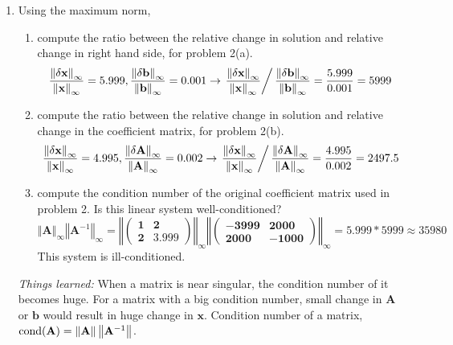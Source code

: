 \documentclass[10pt]{report}
\newcommand{\norm}[2][\infty] {\left\Vert \mathbf{#2} \right\Vert_#1}
\begin{document}
\begin{enumerate}
	\item 
	Using the maximum norm,
	\begin{enumerate}
		\item 
		compute the ratio between the relative change in solution and relative change in right hand side, for problem 2(a).
		\[
		\frac{\norm{\delta x}}{\norm{x}} = 5.999, 
		\frac{\norm{\delta b}}{\norm{b}} = 0.001\to
		\left.\frac{\norm{\delta x}}{\norm{x}}\right/\frac{\norm{\delta b}}{\norm{b}} = \frac{5.999}{0.001} = 5999
		\]
		
		\item 
		compute the ratio between the relative change in solution and relative change in the coefficient matrix, for problem 2(b).
		\[
		\frac{\norm{\delta x}}{\norm{x}} = 4.995, 
		\frac{\norm{\delta A}}{\norm{A}} = 0.002\to
		\left.\frac{\norm{\delta x}}{\norm{x}}\right/\frac{\norm{\delta A}}{\norm{A}}= \frac{4.995}{0.002} = 2497.5
		\]
		
		\item 
		compute the condition number of the original coefficient matrix used in problem 2. Is this linear system well-conditioned?
		\[
		\norm{A}\norm{A^\mathrm{-1}} 
			= \norm{\begin{pmatrix}
			1 & 2\\ 2 & 3.999
			\end{pmatrix}} 
			\norm{\begin{pmatrix}
				-3999 & 2000\\ 2000 & -1000
				\end{pmatrix}} 
			= 5.999 * 5999 \approx 35980
		\]
		This system is ill-conditioned.
	\end{enumerate}
	\textit{Things learned:} When a matrix is near singular, the condition number of it becomes huge. For a matrix with a big condition number, small change in $\mathbf{A}$ or $\mathbf{b}$ would result in huge change in $\mathbf{x}$. Condition number of a matrix, $\text{cond}(\bf A) = \left\Vert \mathbf{A}\right\Vert \left\Vert \mathbf{A}^{\rm -1}\right\Vert$.
	

\end{enumerate}
\end{document}
